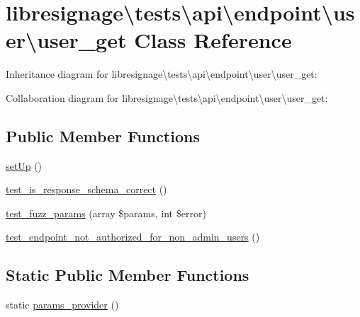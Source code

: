\hypertarget{classlibresignage_1_1tests_1_1api_1_1endpoint_1_1user_1_1user__get}{}\section{libresignage\textbackslash{}tests\textbackslash{}api\textbackslash{}endpoint\textbackslash{}user\textbackslash{}user\+\_\+get Class Reference}
\label{classlibresignage_1_1tests_1_1api_1_1endpoint_1_1user_1_1user__get}


Inheritance diagram for libresignage\textbackslash{}tests\textbackslash{}api\textbackslash{}endpoint\textbackslash{}user\textbackslash{}user\+\_\+get\+:


Collaboration diagram for libresignage\textbackslash{}tests\textbackslash{}api\textbackslash{}endpoint\textbackslash{}user\textbackslash{}user\+\_\+get\+:
\subsection*{Public Member Functions}
\begin{DoxyCompactItemize}
\item 
\hyperlink{classlibresignage_1_1tests_1_1api_1_1endpoint_1_1user_1_1user__get_a0300b6387998be287c0577d0aaf45e70}{set\+Up} ()
\item 
\hyperlink{classlibresignage_1_1tests_1_1api_1_1endpoint_1_1user_1_1user__get_a94140f25b804eea3061deb0ceca57f2f}{test\+\_\+is\+\_\+response\+\_\+schema\+\_\+correct} ()
\item 
\hyperlink{classlibresignage_1_1tests_1_1api_1_1endpoint_1_1user_1_1user__get_a5854f90eaaa8e516f1fafde232949172}{test\+\_\+fuzz\+\_\+params} (array \$params, int \$error)
\item 
\hyperlink{classlibresignage_1_1tests_1_1api_1_1endpoint_1_1user_1_1user__get_a8012ffd28e3bf3703efe32e2d3b198d7}{test\+\_\+endpoint\+\_\+not\+\_\+authorized\+\_\+for\+\_\+non\+\_\+admin\+\_\+users} ()
\end{DoxyCompactItemize}
\subsection*{Static Public Member Functions}
\begin{DoxyCompactItemize}
\item 
static \hyperlink{classlibresignage_1_1tests_1_1api_1_1endpoint_1_1user_1_1user__get_af94bdb5075ce6d6d40f7685fd8521f8d}{params\+\_\+provider} ()
\end{DoxyCompactItemize}
